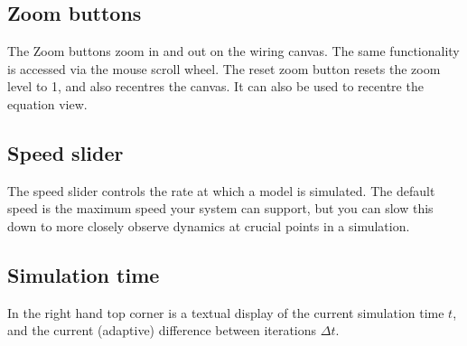 %
%
%
%
%
%
%

\subsection{Zoom buttons}
\label{ZoomButtons}

\begin{center}
\end{center}

The Zoom buttons zoom in and out on the wiring canvas. The same functionality
is accessed via the mouse scroll wheel. The reset zoom button
 resets the zoom level to 1, and also
recentres the canvas. It can also be used to recentre the equation view.

\subsection{Speed slider}
\label{Speedslider}

\begin{center}
\end{center}

The speed slider controls the rate at which a model is simulated. The
default speed is the maximum speed your system can support, but you
can slow this down to more closely observe dynamics at crucial points
in a simulation.

\subsection{Simulation time}
\label{SimTime}

In the right hand top corner is a textual display of the current
simulation time $t$, and the current (adaptive) difference between
iterations $\Delta t$.


